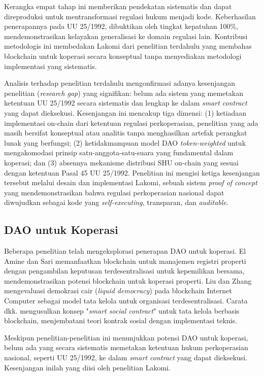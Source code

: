 Kerangka empat tahap ini memberikan pendekatan sistematis dan dapat direproduksi untuk mentransformasi regulasi hukum menjadi kode. Keberhasilan penerapannya pada UU 25/1992, dibuktikan oleh tingkat kepatuhan 100\%, mendemonstrasikan kelayakan generalisasi ke domain regulasi lain. Kontribusi metodologis ini membedakan Lakomi dari penelitian terdahulu yang membahas blockchain untuk koperasi secara konseptual tanpa menyediakan metodologi implementasi yang sistematis.

Analisis terhadap penelitian terdahulu mengonfirmasi adanya kesenjangan penelitian (\textit{research gap}) yang signifikan: belum ada sistem yang memetakan ketentuan UU 25/1992 secara sistematis dan lengkap ke dalam \textit{smart contract} yang dapat dieksekusi. Kesenjangan ini mencakup tiga dimensi: (1) ketiadaan implementasi on-chain dari ketentuan regulasi perkoperasian, penelitian yang ada masih bersifat konseptual atau analitis tanpa menghasilkan artefak perangkat lunak yang berfungsi; (2) ketidakmampuan model DAO \textit{token-weighted} untuk mengakomodasi prinsip satu-anggota-satu-suara yang fundamental dalam koperasi; dan (3) absennya mekanisme distribusi SHU on-chain yang sesuai dengan ketentuan Pasal 45 UU 25/1992. Penelitian ini mengisi ketiga kesenjangan tersebut melalui desain dan implementasi Lakomi, sebuah sistem \textit{proof of concept} yang mendemonstrasikan bahwa regulasi perkoperasian nasional dapat diwujudkan sebagai kode yang \textit{self-executing}, transparan, dan \textit{auditable}.

\subsection{DAO untuk Koperasi}

Beberapa penelitian telah mengeksplorasi penerapan DAO untuk koperasi. El Amine dan Sari \cite{elamine2024blockchain} memanfaatkan blockchain untuk manajemen registri properti dengan pengambilan keputusan terdesentralisasi untuk kepemilikan bersama, mendemonstrasikan potensi blockchain untuk koperasi properti. Liu dan Zhang \cite{liu2024economics} mengevaluasi demokrasi cair (\textit{liquid democracy}) pada blockchain Internet Computer sebagai model tata kelola untuk organisasi terdesentralisasi. Carata dkk. \cite{carata2024smart} mengusulkan konsep "\textit{smart social contract}" untuk tata kelola berbasis blockchain, menjembatani teori kontrak sosial dengan implementasi teknis.

Meskipun penelitian-penelitian ini menunjukkan potensi DAO untuk koperasi, belum ada yang secara sistematis memetakan ketentuan hukum perkoperasian nasional, seperti UU 25/1992, ke dalam \textit{smart contract} yang dapat dieksekusi. Kesenjangan inilah yang diisi oleh penelitian Lakomi.

